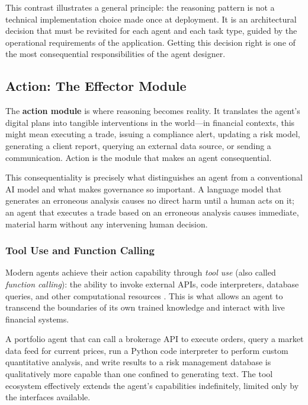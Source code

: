 \documentclass{article}
\begin{document}
This contrast illustrates a general principle: the reasoning pattern is not a technical implementation choice made once at deployment. It is an architectural decision that must be revisited for each agent and each task type, guided by the operational requirements of the application. Getting this decision right is one of the most consequential responsibilities of the agent designer.


\subsection{Action: The Effector Module}
\label{subsec:action}
The \textbf{action module} is where reasoning becomes reality. It translates the agent's digital plans into tangible interventions in the world—in financial contexts, this might mean executing a trade, issuing a compliance alert, updating a risk model, generating a client report, querying an external data source, or sending a communication. Action is the module that makes an agent consequential.

This consequentiality is precisely what distinguishes an agent from a conventional AI model and what makes governance so important. A language model that generates an erroneous analysis causes no direct harm until a human acts on it; an agent that executes a trade based on an erroneous analysis causes immediate, material harm without any intervening human decision.

\subsubsection{Tool Use and Function Calling}

Modern agents achieve their action capability through \textit{tool use} (also called \textit{function calling}): the ability to invoke external APIs, code interpreters, database queries, and other computational resources \cite{schick2023toolformer}. This is what allows an agent to transcend the boundaries of its own trained knowledge and interact with live financial systems.

A portfolio agent that can call a brokerage API to execute orders, query a market data feed for current prices, run a Python code interpreter to perform custom quantitative analysis, and write results to a risk management database is qualitatively more capable than one confined to generating text. The tool ecosystem effectively extends the agent's capabilities indefinitely, limited only by the interfaces available.
\end{document}
